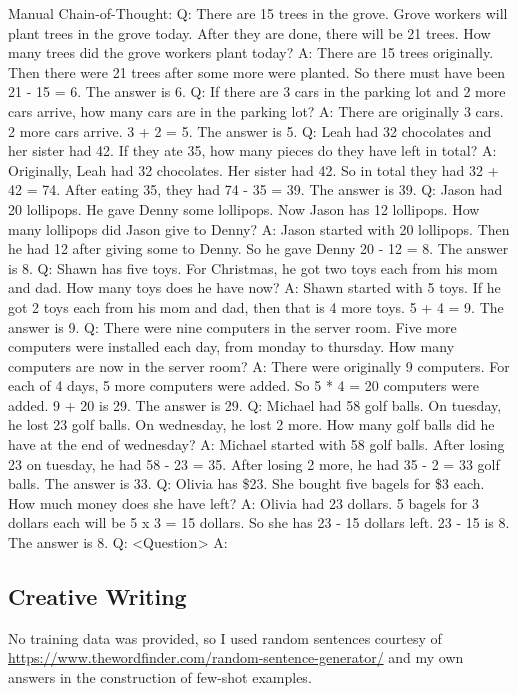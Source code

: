 \documentclass[11pt]{article}
\begin{document}
Manual Chain-of-Thought:
Q: There are 15 trees in the grove. Grove workers will plant trees in the grove today. After they are done, there
will be 21 trees. How many trees did the grove workers plant today?
A: There are 15 trees originally. Then there were 21 trees after some more were planted. So there must have
been 21 - 15 = 6. The answer is 6.
Q: If there are 3 cars in the parking lot and 2 more cars arrive, how many cars are in the parking lot?
A: There are originally 3 cars. 2 more cars arrive. 3 + 2 = 5. The answer is 5.
Q: Leah had 32 chocolates and her sister had 42. If they ate 35, how many pieces do they have left in total?
A: Originally, Leah had 32 chocolates. Her sister had 42. So in total they had 32 + 42 = 74. After eating 35, they
had 74 - 35 = 39. The answer is 39.
Q: Jason had 20 lollipops. He gave Denny some lollipops. Now Jason has 12 lollipops. How many lollipops did
Jason give to Denny?
A: Jason started with 20 lollipops. Then he had 12 after giving some to Denny. So he gave Denny 20 - 12 = 8.
The answer is 8.
Q: Shawn has five toys. For Christmas, he got two toys each from his mom and dad. How many toys does he
have now?
A: Shawn started with 5 toys. If he got 2 toys each from his mom and dad, then that is 4 more toys. 5 + 4 = 9.
The answer is 9.
Q: There were nine computers in the server room. Five more computers were installed each day, from monday
to thursday. How many computers are now in the server room?
A: There were originally 9 computers. For each of 4 days, 5 more computers were added. So 5 * 4 = 20
computers were added. 9 + 20 is 29. The answer is 29.
Q: Michael had 58 golf balls. On tuesday, he lost 23 golf balls. On wednesday, he lost 2 more. How many golf
balls did he have at the end of wednesday?
A: Michael started with 58 golf balls. After losing 23 on tuesday, he had 58 - 23 = 35. After losing 2 more, he
had 35 - 2 = 33 golf balls. The answer is 33.
Q: Olivia has \$23. She bought five bagels for \$3 each. How much money does she have left?
A: Olivia had 23 dollars. 5 bagels for 3 dollars each will be 5 x 3 = 15 dollars. So she has 23 - 15 dollars left. 23
- 15 is 8. The answer is 8.
Q: <Question>
A:

\subsection{Creative Writing}

No training data was provided, so I used random sentences courtesy of \url{https://www.thewordfinder.com/random-sentence-generator/} and my own answers in the construction of few-shot examples.
\end{document}
